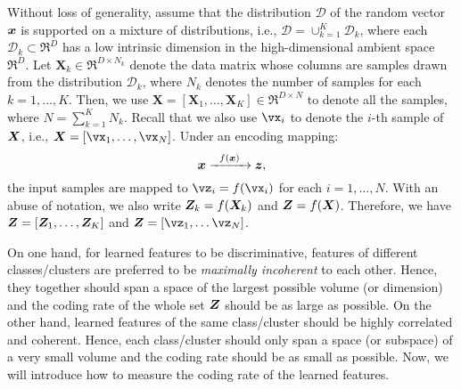 \documentclass[../../book-main.tex]{subfiles}
\begin{document}

Without loss of generality, assume that the distribution $\mathcal D$ of the random vector $\bm{x}$ is supported on a mixture of distributions, i.e., $\mathcal D = \cup_{k=1}^K \mathcal{D}_k$,  where each $\mathcal{D}_k \subset \Re^D$ has a low intrinsic dimension in the high-dimensional ambient space $\Re^D$. Let $\bm X_k \in \Re^{D\times N_k}$ denote the data matrix whose columns are samples drawn from the distribution $\mathcal{D}_k$, where $N_k$ denotes the number of samples for each $k=1,\dots,K$. Then, we use $\bm X=[\bm X_1,\dots,\bm X_K] \in \Re^{D\times N}$ to denote all the samples, where $N=\sum_{k=1}^K N_k$. 
Recall that we also use $\vx_i$ to denote the $i$-th sample of $\bm{X}$, i.e., $\X=[\vx_1,\dots,\vx_N] $. Under an encoding mapping:
\begin{equation}
	\bm{x}   \xrightarrow{\hspace{2mm} f(\bm{x})\hspace{2mm}} \bm{z},
\end{equation}
the input samples are mapped to $\vz_i = f(\vx_i)$ for each $i=1,\dots,N$. With an abuse of notation, we also write $\bm{Z}_k = f(\bm{X}_k)$ and $\bm{Z} = f(\bm{X})$. Therefore, we have $\bm{Z} = [\bm Z_1,\dots,\bm Z_K]$ and $\Z = [\vz_1,\dots\vz_N]$. 

On one hand, for learned features to be discriminative, features of different classes/clusters are preferred to be {\em maximally incoherent} to each other. Hence, they together should span a space of the largest possible volume (or dimension) and the coding rate of the whole set $\bm{Z}$ should be as large as possible. On the other hand, learned features of the same class/cluster should be highly correlated and coherent. Hence, each class/cluster should only span a space (or subspace) of a very small volume and the coding rate should be as small as possible. Now, we will introduce how to measure the coding rate of the learned features.  
\end{document}
